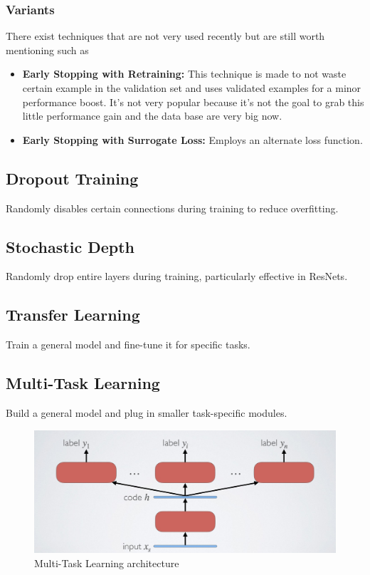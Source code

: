 \documentclass{article}
\begin{document}
\subsubsection{Variants}
There exist techniques that are not very used recently but are still worth mentioning such as

\begin{itemize}
\item \textbf{Early Stopping with Retraining:} This technique is made to not waste certain example in the validation set and uses validated examples for a minor performance boost. It's not very popular because it's not the goal to grab this little performance gain and the data base are very big now.
\item \textbf{Early Stopping with Surrogate Loss:} Employs an alternate loss function.
\end{itemize}

\subsection{Dropout Training}
Randomly disables certain connections during training to reduce overfitting.

\subsection{Stochastic Depth}
Randomly drop entire layers during training, particularly effective in ResNets.

\subsection{Transfer Learning}
Train a general model and fine-tune it for specific tasks.

\subsection{Multi-Task Learning}
Build a general model and plug in smaller task-specific modules.
\begin{figure}[ht]
    \centering
    \includegraphics[width=\linewidth]{graphics/multitask-learning.jpg}
    \caption{Multi-Task Learning architecture}
    \label{fig:multitask-learning}
\end{figure}
\end{document}
